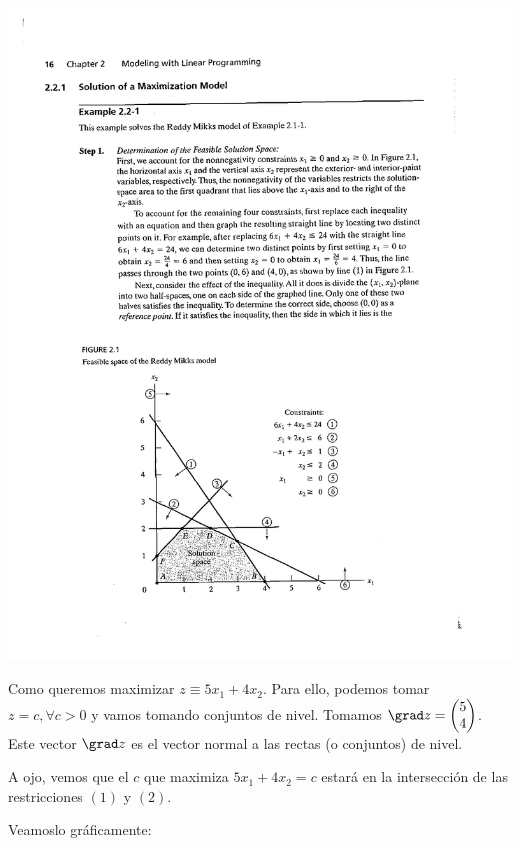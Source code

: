 \documentclass[palatino]{apuntes}
\begin{document}
\begin{example}
\begin{center}
\includegraphics[scale=0.8]{tex/berrendero/tema1/_GraficoEjemplo1}
\end{center}


Como queremos maximizar $z\equiv 5x_1+4x_2$. Para ello, podemos tomar $z = c, ∀c>0$ y vamos tomando conjuntos de nivel. 
Tomamos $\grad z = \begin{pmatrix}5\\4\end{pmatrix}$. Este vector $\grad z$ es el vector normal a las rectas (o conjuntos) de nivel.

A ojo, vemos que el $c$ que maximiza $5x_1 + 4x_2 = c$ estará en la intersección de las restricciones $(1)$ y $(2)$.

Veamoslo gráficamente:


\end{example}
\end{document}
